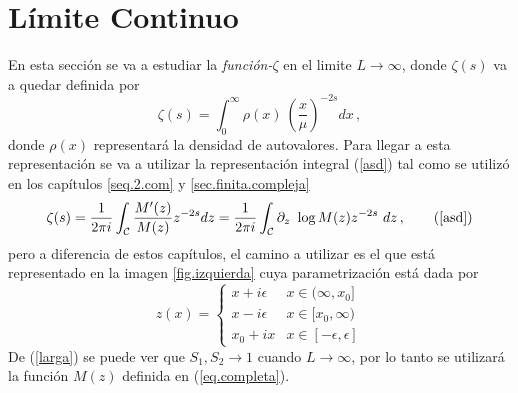 \chapter{Límite Continuo}\label{cap.continuo}

En esta sección se va a estudiar la {\it función-$\zeta $} en el limite $L \rightarrow \infty$, donde $\zeta  (s)$ va a quedar definida por
\begin{equation}
	\zeta (s) = \int _{0} ^{\infty} \rho (x) \ \left( \frac{x}{\mu } 			\right) ^{-2 s} dx
\, ,	
\label{eq.zeta.continuo}
\end{equation}
donde $\rho(x) $ representará la densidad de autovalores. Para llegar a esta representación se va a utilizar la representación integral (\ref{asd}) tal como se utilizó en los capítulos \ref{seq.2.com} y  \ref{sec.finita.compleja}
\begin{equation}
\zeta (s) = 
\frac{1}{2 \pi i} 
\int _{\mathcal{C}}
\frac{M ' ( z ) }{ M ( z ) } z ^{-2s} d z = 
\frac{1}{2 \pi i} 
\int _{\mathcal{C}}
\partial _z \ \log 	M(z)  z ^{-2s} \ dz
	\, ,
	\tag{\ref{asd}}
\end{equation}
pero a diferencia de estos capítulos, el camino a utilizar es el que está representado en la imagen \ref{fig.izquierda} cuya parametrización está dada por 
\begin{equation}
z(x) =  
	  \begin{cases} 
      x + i \epsilon  &  x \in ( \infty, x_0] \\
      x - i \epsilon  &  x \in  [ x_0, \infty) \\
      x _0 + i x	  &  x \in [-\epsilon,\epsilon]
   \end{cases}
\label{eq.para.con}
\end{equation}
De (\ref{larga}) se puede ver que $S _1,S _2 \rightarrow 1$ cuando $L \rightarrow \infty$, por lo tanto se utilizará la función $M (z)$ definida en (\ref{eq.completa}).


